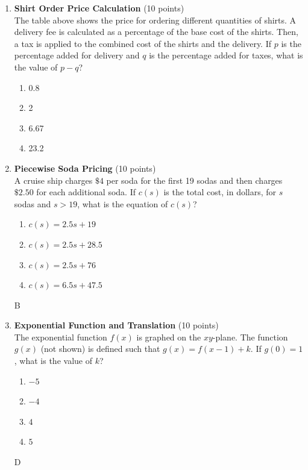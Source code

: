 \begin{enumerate}
  \newpage


  \item \textbf{Shirt Order Price Calculation} (10 points)\\
  The table above shows the price for ordering different quantities of shirts. A delivery fee is calculated as a percentage of the base cost of the shirts. Then, a tax is applied to the combined cost of the shirts and the delivery. If $p$ is the percentage added for delivery and $q$ is the percentage added for taxes, what is the value of $p-q$?
  \begin{enumerate}[label=(\Alph*)]
    \item 0.8
    \item 2
    \item 6.67
    \item 23.2
  \end{enumerate}
  \begin{subanswer}
  \end{subanswer}

  \item \textbf{Piecewise Soda Pricing} (10 points)\\
  A cruise ship charges $\$4$ per soda for the first 19 sodas and then charges $\$2.50$ for each additional soda. If $c(s)$ is the total cost, in dollars, for $s$ sodas and $s>19$, what is the equation of $c(s)$?
  \begin{enumerate}[label=(\Alph*)]
    \item $c(s) = 2.5s + 19$
    \item $c(s) = 2.5s + 28.5$
    \item $c(s) = 2.5s + 76$
    \item $c(s) = 6.5s + 47.5$
  \end{enumerate}
  \begin{subanswer}
    B
  \end{subanswer}






  \newpage

  
  \item \textbf{Exponential Function and Translation} (10 points)\\
  The exponential function $f(x)$ is graphed on the $xy$-plane. The function $g(x)$ (not shown) is defined such that $g(x) = f(x-1) + k$. If $g(0) = 1$, what is the value of $k$?
  \begin{enumerate}[label=(\Alph*)]
    \item $-5$
    \item $-4$
    \item $4$
    \item $5$
  \end{enumerate}
  \begin{subanswer}
    D
  \end{subanswer}



\end{enumerate}
